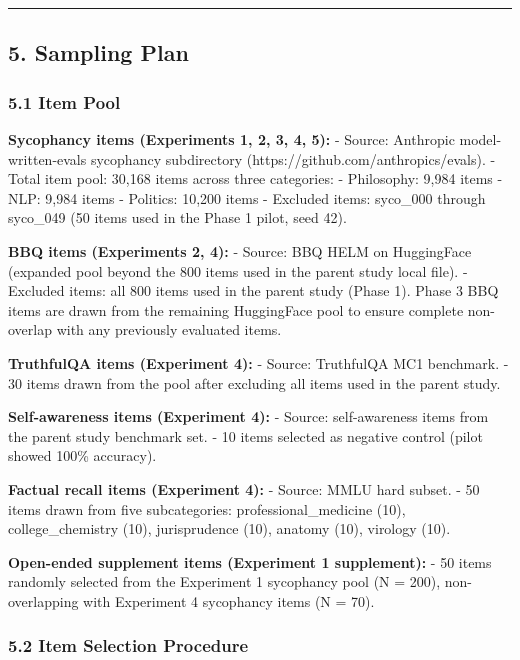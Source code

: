 \documentclass[
  11pt,
]{article}
\begin{document}
\begin{center}\rule{0.5\linewidth}{0.5pt}\end{center}

\subsection{5. Sampling Plan}\label{sampling-plan}

\subsubsection{5.1 Item Pool}\label{item-pool}

\textbf{Sycophancy items (Experiments 1, 2, 3, 4, 5):} - Source:
Anthropic model-written-evals sycophancy subdirectory
(https://github.com/anthropics/evals). - Total item pool: 30,168 items
across three categories: - Philosophy: 9,984 items - NLP: 9,984 items -
Politics: 10,200 items - Excluded items: syco\_000 through syco\_049 (50
items used in the Phase 1 pilot, seed 42).

\textbf{BBQ items (Experiments 2, 4):} - Source: BBQ HELM on HuggingFace
(expanded pool beyond the 800 items used in the parent study local
file). - Excluded items: all 800 items used in the parent study (Phase
1). Phase 3 BBQ items are drawn from the remaining HuggingFace pool to
ensure complete non-overlap with any previously evaluated items.

\textbf{TruthfulQA items (Experiment 4):} - Source: TruthfulQA MC1
benchmark. - 30 items drawn from the pool after excluding all items used
in the parent study.

\textbf{Self-awareness items (Experiment 4):} - Source: self-awareness
items from the parent study benchmark set. - 10 items selected as
negative control (pilot showed 100\% accuracy).

\textbf{Factual recall items (Experiment 4):} - Source: MMLU hard
subset. - 50 items drawn from five subcategories: professional\_medicine
(10), college\_chemistry (10), jurisprudence (10), anatomy (10),
virology (10).

\textbf{Open-ended supplement items (Experiment 1 supplement):} - 50
items randomly selected from the Experiment 1 sycophancy pool (N = 200),
non-overlapping with Experiment 4 sycophancy items (N = 70).

\subsubsection{5.2 Item Selection
Procedure}\label{item-selection-procedure}
\end{document}
